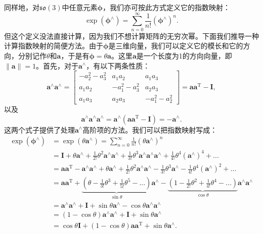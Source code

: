 同样地，对$\mathfrak{so}(3)$中任意元素$\boldsymbol{\phi}$，我们亦可按此方式定义它的指数映射：
\begin{equation}
\exp(\boldsymbol{\phi}^\wedge) = \sum\limits_{n = 0}^\infty  {\frac{1}{{n!}}{ (\boldsymbol{\phi}^{\wedge})^n}}.
\end{equation}
但这个定义没法直接计算，因为我们不想计算矩阵的无穷次幂。下面我们推导一种计算指数映射的简便方法。由于$\boldsymbol{\phi}$是三维向量，我们可以定义它的模长和它的方向，分别记作$\theta$和$\bm{a}$，于是有$\boldsymbol{\phi} = \theta \bm{a}$。这里$\bm{a}$是一个长度为1的方向向量，即$\| \bm{a} \| =1$。首先，对于$\bm{a}^\wedge$，有以下两条性质： %
\begin{equation}
 \bm{a}^{\wedge} \bm{a}^{\wedge} = \left[ {\begin{array}{*{20}{c}}
{ - a_2^2 - a_3^2}&{{a_1}{a_2}}&{{a_1}{a_3}}\\
{{a_1}{a_2}}&{ - a_1^2 - a_3^2}&{{a_2}{a_3}}\\
{{a_1}{a_3}}&{{a_2}{a_3}}&{ - a_1^2 - a_2^2}
\end{array}} \right] = \bm{a} \bm{a}^\mathrm{T} - \bm{I},
\end{equation}
以及
\begin{equation}
\bm{a}^{\wedge} \bm{a}^{\wedge} \bm{a}^{\wedge} = \bm{a}^\wedge (\bm{a}\bm{a}^\mathrm{T}-\bm{I}) = - \bm{a}^{\wedge}.
\end{equation}
这两个式子提供了处理$\bm{a}^\wedge$高阶项的方法。我们可以把指数映射写成：
\begin{align*}
\exp \left( {{\boldsymbol{\phi} ^ \wedge }} \right) &= \exp \left( {\theta {\bm{a}^ \wedge }} \right) = \sum\limits_{n = 0}^\infty  {\frac{1}{{n!}}{{\left( {\theta {\bm{a}^ \wedge }} \right)}^n}} \\
&= \bm{I} + \theta {\bm{a}^ \wedge } + \frac{1}{{2!}}{\theta ^2}{\bm{a}^ \wedge }{\bm{a}^ \wedge } + \frac{1}{{3!}}{\theta ^3}{\bm{a}^ \wedge }{\bm{a}^ \wedge }{\bm{a}^ \wedge } + \frac{1}{{4!}}{\theta ^4}{\left( {{\bm{a}^ \wedge }} \right)^4} + ...\\
&= \bm{a} {\bm{a}^\mathrm{T}} - {\bm{a}^ \wedge }{\bm{a}^ \wedge } + \theta {\bm{a}^ \wedge } + \frac{1}{{2!}}\theta^2 {\bm{a}^ \wedge }{\bm{a}^ \wedge } - \frac{1}{{3!}}{\theta ^3}{\bm{a}^ \wedge } - \frac{1}{{4!}}{\theta ^4}{\left( {{\bm{a}^ \wedge }} \right)^2} + ...\\
&= \bm{a}{\bm{a}^\mathrm{T}} + \underbrace{\left( {\theta  - \frac{1}{{3!}}{\theta ^3} + \frac{1}{{5!}}{\theta ^5} - ...} \right)}_{\sin \theta} {\bm{a}^ \wedge } - \underbrace{\left( {1 - \frac{1}{{2!}}{\theta ^2} + \frac{1}{{4!}}{\theta ^4} - ...} \right)}_{\cos \theta}{\bm{a}^ \wedge }{\bm{a}^ \wedge }\\
&= {\bm{a}^ \wedge }{\bm{a}^ \wedge } + \bm{I} + \sin \theta {\bm{a}^ \wedge } - \cos \theta {\bm{a}^ \wedge }{\bm{a}^ \wedge }\\
&= (1 - \cos \theta ){\bm{a}^ \wedge }{\bm{a}^ \wedge } + \bm{I} + \sin \theta {\bm{a}^ \wedge }\\
&= \cos \theta \bm{I} + (1 - \cos \theta )\bm{a}{\bm{a}^\mathrm{T}} + \sin \theta {\bm{a}^ \wedge }.
\end{align*}

